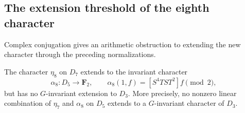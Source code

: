 \subsection{The extension threshold of the eighth character}
\label{subsec:eta-eight-extension-threshold}

Complex conjugation gives an arithmetic obstruction to extending the
new character through the preceding normalizations.

\begin{proposition}\label{prop:eta-eight-no-extension-d3}
The character $\eta_8$ on $D_7$ extends to the invariant character
\[
 \alpha_8:D_5\longrightarrow\mathbf F_2,\qquad
 \alpha_8(1,f)=[S^4TST^2]f\pmod2,
\]
but has no $G$-invariant extension to $D_3$. More precisely, no
nonzero linear combination of $\eta_7$ and $\alpha_8$ on $D_5$
extends to a $G$-invariant character of $D_3$.
\end{proposition}


